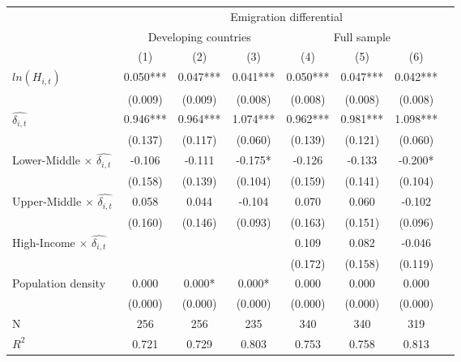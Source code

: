 \begin{tabular}{lcccccc}
\toprule
 & \multicolumn{7}{c}{Emigration differential} \\ \cmidrule(lr){2-7} & \multicolumn{3}{c}{Developing countries} & \multicolumn{3}{c}{Full sample} \\ \cmidrule(lr){2-4} \cmidrule(lr){5-7} & (1) & (2) & (3) & (4) & (5) & (6) \\
\midrule
$ ln(H_{i,t}) $     &       0.050***&       0.047***&       0.041***&       0.050***&       0.047***&       0.042***\\
                    &     (0.009)   &     (0.009)   &     (0.008)   &     (0.008)   &     (0.008)   &     (0.008)   \\
$ \widehat{\delta_{i,t}} $&       0.946***&       0.964***&       1.074***&       0.962***&       0.981***&       1.098***\\
                    &     (0.137)   &     (0.117)   &     (0.060)   &     (0.139)   &     (0.121)   &     (0.060)   \\
Lower-Middle $\times$ $ \widehat{\delta_{i,t}} $&      -0.106   &      -0.111   &      -0.175*  &      -0.126   &      -0.133   &      -0.200*  \\
                    &     (0.158)   &     (0.139)   &     (0.104)   &     (0.159)   &     (0.141)   &     (0.104)   \\
Upper-Middle $\times$ $ \widehat{\delta_{i,t}} $&       0.058   &       0.044   &      -0.104   &       0.070   &       0.060   &      -0.102   \\
                    &     (0.160)   &     (0.146)   &     (0.093)   &     (0.163)   &     (0.151)   &     (0.096)   \\
High-Income $\times$ $ \widehat{\delta_{i,t}} $&               &               &               &       0.109   &       0.082   &      -0.046   \\
                    &               &               &               &     (0.172)   &     (0.158)   &     (0.119)   \\
Population density  &       0.000   &       0.000*  &       0.000*  &       0.000   &       0.000   &       0.000   \\
                    &     (0.000)   &     (0.000)   &     (0.000)   &     (0.000)   &     (0.000)   &     (0.000)   \\
\midrule
N                   &         256   &         256   &         235   &         340   &         340   &         319   \\
$R^2$               &       0.721   &       0.729   &       0.803   &       0.753   &       0.758   &       0.813   \\

\end{tabular}
